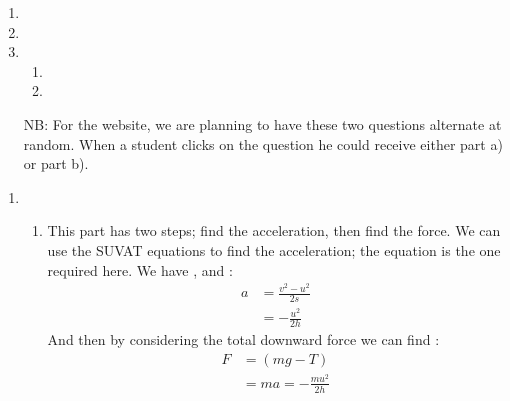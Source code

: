 

\begin{problem}[HE+_Lift]%
{ 
\begin{enumerate} 
	\item {}
	\item {}
\item {} 
\begin{enumerate}
	\item {}
	\item {}
\end{enumerate}
NB: For the website, we are planning to have these two questions alternate at random. When a student clicks on the question he could receive either part a) or part b).
\end{enumerate}
}
{}
{\begin{enumerate}
\item
\begin{enumerate}
	\item This part has two steps; find the acceleration, then find the force. We can use the SUVAT equations to find the acceleration; the equation  is the one required here. We have ,  and :
\begin{eqnarray*} 
a &= \frac{v^{2} - u^{2}}{2s} \\ 
&= -\frac{u^{2}}{2h} 
\end{eqnarray*}
And then by considering the total downward force we can find :
\begin{eqnarray*} 
F &= (mg - T) \\ 
&= ma = -\frac{mu^{2}}{2h} 
\end{eqnarray*}

\end{enumerate}
\end{enumerate}}
\end{problem}
